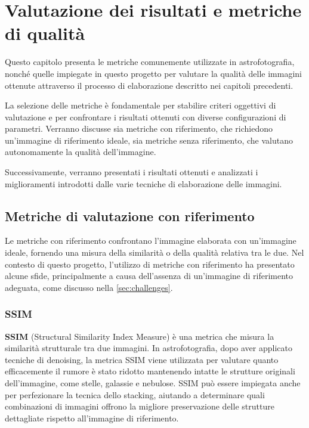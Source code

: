 \chapter{Valutazione dei risultati e metriche di qualità} \label{chap:evaluation}

Questo capitolo presenta le metriche comunemente utilizzate in astrofotografia, nonché quelle impiegate in questo progetto per valutare la qualità delle immagini ottenute attraverso il processo di elaborazione descritto nei capitoli precedenti.

La selezione delle metriche è fondamentale per stabilire criteri oggettivi di valutazione e per confrontare i risultati ottenuti con diverse configurazioni di parametri. Verranno discusse sia metriche con riferimento, che richiedono un'immagine di riferimento ideale, sia metriche senza riferimento, che valutano autonomamente la qualità dell'immagine.

Successivamente, verranno presentati i risultati ottenuti e analizzati i miglioramenti introdotti dalle varie tecniche di elaborazione delle immagini.


\section{Metriche di valutazione con riferimento} \label{sec:r_metrics}

Le metriche con riferimento confrontano l'immagine elaborata con un'immagine ideale, fornendo una misura della similarità o della qualità relativa tra le due. Nel contesto di questo progetto, l'utilizzo di metriche con riferimento ha presentato alcune sfide, principalmente a causa dell'assenza di un'immagine di riferimento adeguata, come discusso nella \cref{sec:challenges}.

\subsection{SSIM} \label{subsec:ssim}

\textbf{SSIM} (Structural Similarity Index Measure) è una metrica che misura la similarità strutturale tra due immagini. In astrofotografia, dopo aver applicato tecniche di denoising, la metrica SSIM viene utilizzata per valutare quanto efficacemente il rumore è stato ridotto mantenendo intatte le strutture originali dell'immagine, come stelle, galassie e nebulose. SSIM può essere impiegata anche per perfezionare la tecnica dello stacking, aiutando a determinare quali combinazioni di immagini offrono la migliore preservazione delle strutture dettagliate rispetto all'immagine di riferimento.

